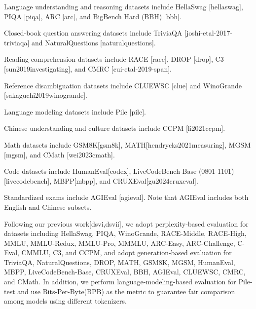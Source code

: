 \documentclass[11pt,a4paper]{article}
\begin{document}
Language understanding and reasoning datasets include HellaSwag [hellaswag], PIQA [piqa], ARC [arc], and BigBench Hard (BBH) [bbh].

Closed-book question answering datasets include TriviaQA [joshi-etal-2017-triviaqa] and NaturalQuestions [naturalquestions].

Reading comprehension datasets include RACE [race], DROP [drop], C3 [sun2019investigating], and CMRC [cui-etal-2019-span].

Reference disambiguation datasets include CLUEWSC [clue] and WinoGrande [sakaguchi2019winogrande].

Language modeling datasets include Pile [pile].

Chinese understanding and culture datasets include CCPM [li2021ccpm].

Math datasets include GSM8K[gsm8k], MATH[hendrycks2021measuring], MGSM [mgsm], and CMath [wei2023cmath].

Code datasets include HumanEval[codex], LiveCodeBench-Base (0801-1101) [livecodebench], MBPP[mbpp], and CRUXEval[gu2024cruxeval].

Standardized exams include AGIEval [agieval]. 
Note that AGIEval includes both English and Chinese subsets.

Following our previous work[dsvi,dsvii], we adopt perplexity-based evaluation for datasets including HellaSwag, PIQA, WinoGrande, RACE-Middle, RACE-High, MMLU, MMLU-Redux, MMLU-Pro, MMMLU, ARC-Easy, ARC-Challenge, C-Eval, CMMLU, C3, and CCPM, and adopt generation-based evaluation for TriviaQA, NaturalQuestions, DROP, MATH, GSM8K, MGSM, HumanEval, MBPP, LiveCodeBench-Base, CRUXEval, BBH, AGIEval, CLUEWSC, CMRC, and CMath. 
In addition, we perform language-modeling-based evaluation for Pile-test and use Bits-Per-Byte(BPB) as the metric to guarantee fair comparison among models using different tokenizers.
\end{document}
